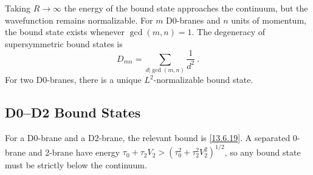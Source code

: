 Taking $R \to \infty$ the energy of the bound state approaches the continuum, but the wavefunction remains normalizable. For $m$ D0-branes and $n$ units of momentum, the bound state exists whenever $\gcd(m,n) = 1$. The degeneracy of supersymmetric bound states is
\begin{equation}
	D_{mn} = \sum_{d|\gcd(m,n)} \frac{1}{d^2} \:. \label{13.6.24}
\end{equation}
For two D0-branes, there is a unique $L^2$-normalizable bound state.

\subsection*{D0--D2 Bound States}

For a D0-brane and a D2-brane, the relevant bound is \eqref{13.6.19}. A separated 0-brane and 2-brane have energy $\tau_0 + \tau_2 V_2 > (\tau_0^2 + \tau_2^2 V_2^2)^{1/2}$, so any bound state must be strictly below the continuum.

